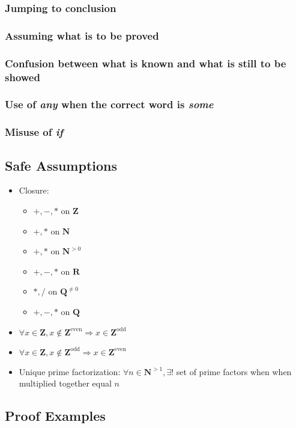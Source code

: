 \documentclass[12pt]{article}
\begin{document}
\subsubsection*{Jumping to conclusion}

\subsubsection*{Assuming what is to be proved}

\subsubsection*{Confusion between what is known and what is still to be showed}

\subsubsection*{Use of \emph{any} when the correct word is \emph{some}}

\subsubsection*{Misuse of \emph{if}}

\subsection*{Safe Assumptions}

\begin{itemize}
    \item Closure:
    \begin{itemize}
        \item $+, -, *$ on $\mathbf Z$
        \item $+, *$ on $\mathbf N$
        \item $+, *$ on $\mathbf N^{>0}$
        \item $+, -, *$ on $\mathbf R$
        \item $*, /$ on $\mathbf Q^{\neq 0}$
        \item $+, -, *$ on $\mathbf Q$
    \end{itemize}
    \item $\forall x \in \mathbf Z, x \not\in \mathbf Z^{\text{even}} \Rightarrow x \in \mathbf Z^{\text{odd}}$
    \item $\forall x \in \mathbf Z, x \not\in \mathbf Z^{\text{odd}} \Rightarrow x \in \mathbf Z^{\text{even}}$
    \item Unique prime factorization: $\forall n \in \mathbf N^{>1}, \exists!$ set of prime factors when when multiplied together equal $n$
\end{itemize}

\subsection*{Proof Examples}
\end{document}
